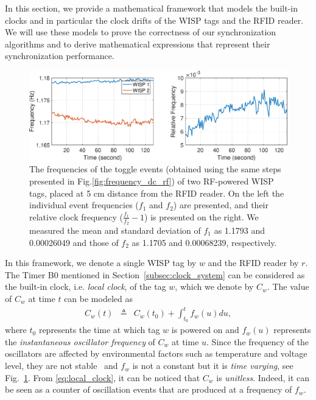 \documentclass[10pt,journal,compsoc]{IEEEtran}
\begin{document}
In this section, we provide a mathematical framework that models the built-in clocks and in particular the clock drifts of the WISP tags and the RFID reader. We will use these models to prove the correctness of our synchronization algorithms and to derive mathematical expressions that represent their synchronization performance.
\begin{figure}
	\centering
	\includegraphics[width=1.4\columnwidth] {figures/relative_clock_frequency.eps}
	\caption{\label{fig:frequency}The frequencies of the toggle events (obtained using the same steps presented in Fig.\ref{fig:frequency_dc_rf}) of two RF-powered WISP tags, placed at 5 cm distance from the RFID reader. On the left the individual event frequencies ($f_1$ and $f_2$) are presented, and their relative clock frequency ($\frac{f_1}{f_2}-1$) is presented on the right. We measured the mean and standard deviation of $f_1$ as 1.1793 and 0.00026049 and those of $f_2$ as 1.1705 and  0.00068239, respectively.}
\end{figure}
In this framework, we denote a single WISP tag by $w$ and the RFID reader by $r$. The Timer B0 mentioned in Section~\ref{subsec:clock_system} can be considered as the built-in clock, i.e. \emph{local clock}, of the tag $w$, 
which we denote by $C_{w}$. The value of $C_{w}$ at time $t$ can be modeled as
%
\begin{eqnarray}
C_{w}(t) & \triangleq & C_w(t_0)+ \int_{t_0}^{t}f_{w}(u)du, 
\label{eq:local_clock}
\end{eqnarray}
%
where $t_0$ represents the time at which tag $w$ is powered on and  $f_{w}(u)$ represents the \emph{instantaneous oscillator frequency} of $C_{w}$ at time $u$. Since the frequency of the oscillators are affected by environmental factors such as temperature and voltage level, they are not stable~\cite{Lenzen2009Optimal} and $f_{w}$ is not a constant but it is \emph{time varying}, see Fig.~\ref{fig:frequency}. From \eqref{eq:local_clock}, it can be noticed that $C_w$ is \emph{unitless}. Indeed, it can be seen as a counter of oscillation events that are produced at a frequency of $f_w$.
\end{document}
